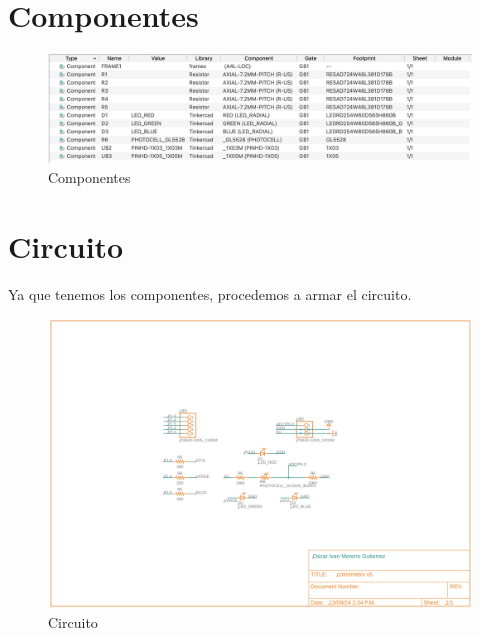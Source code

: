 \documentclass[12pt]{report}
\begin{document}
\section{Componentes}
\begin{figure}[H]
  \centering
  \includegraphics[width=1.0\textwidth]{Componentes.png}
  \caption{Componentes}
  \label{fig:Componentes} 
\end{figure}
\section{Circuito}
Ya que tenemos los componentes, procedemos a armar el circuito.
\begin{figure}[H]
  \centering
  \includegraphics[width=1.5\textwidth, angle=90]{esquematico.png}
  \caption{Circuito}
  \label{fig:Circuito}
\end{figure}
\newpage
\end{document}
